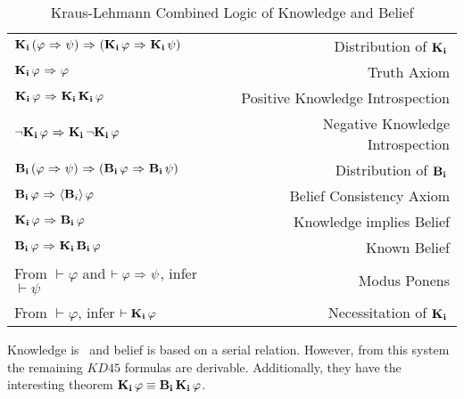 \begin{table}[H]
	\begin{center}
		\begin{tabular}{| l r |}
			\hline
			$\mathbf{K}_{\mathbf{i}}\,(\varphi {\ \Rightarrow \ } \psi) {\ \Rightarrow \ } (\mathbf{K}_{\mathbf{i}}\,\varphi {\ \Rightarrow \ } \mathbf{K}_{\mathbf{i}}\,\psi)$ & Distribution of $\mathbf{K}_{\mathbf{i}}\,$ \\
			$\mathbf{K}_{\mathbf{i}}\,\varphi {\ \Rightarrow \ } \varphi$ & Truth Axiom \\
			$\mathbf{K}_{\mathbf{i}}\,\varphi {\ \Rightarrow \ } \mathbf{K}_{\mathbf{i}}\,\mathbf{K}_{\mathbf{i}}\,\varphi$ & Positive Knowledge Introspection\\
			${\neg}\mathbf{K}_{\mathbf{i}}\,\varphi {\ \Rightarrow \ } \mathbf{K}_{\mathbf{i}}\,{\neg}\mathbf{K}_{\mathbf{i}}\,\varphi$ & Negative Knowledge Introspection\\
			$\mathbf{B}_{\mathbf{i}}\,(\varphi {\ \Rightarrow \ } \psi) {\ \Rightarrow \ } (\mathbf{B}_{\mathbf{i}}\,\varphi {\ \Rightarrow \ } \mathbf{B}_{\mathbf{i}}\,\psi)$ & Distribution of $\mathbf{B}_{\mathbf{i}}\,$\\
			$\mathbf{B}_{\mathbf{i}}\,\varphi {\ \Rightarrow \ } \langle \mathbf{B}_{i} \rangle\,\varphi$ & Belief Consistency Axiom\\
			$\mathbf{K}_{\mathbf{i}}\,\varphi {\ \Rightarrow \ } \mathbf{B}_{\mathbf{i}}\,\varphi$ & Knowledge implies Belief \\
			$\mathbf{B}_{\mathbf{i}}\,\varphi {\ \Rightarrow \ } \mathbf{K}_{\mathbf{i}}\,\mathbf{B}_{\mathbf{i}}\,\varphi$ & Known Belief\\
			From $\vdash \varphi$ and $\vdash \varphi {\ \Rightarrow \ } \psi$, infer $\vdash\psi$ & Modus Ponens\\
			From $\vdash \varphi$, infer $\vdash \mathbf{K}_{\mathbf{i}}\,\varphi$ & Necessitation of $\mathbf{K}_{\mathbf{i}}\,$\\
			\hline
		\end{tabular}
		\caption{Kraus-Lehmann Combined Logic of Knowledge and Belief}
	\end{center}
\end{table}

Knowledge is \SFive\ and belief is based on a serial relation. However, from this system the remaining $\mathit{KD45}$ formulas are derivable. Additionally, they have the interesting theorem $\mathbf{K}_{\mathbf{i}}\,\varphi \equiv \mathbf{B}_{\mathbf{i}}\,\mathbf{K}_{\mathbf{i}}\,\varphi$. 

